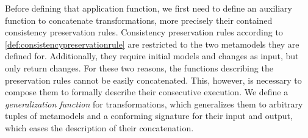 Before defining that application function, we first need to define an auxiliary function to concatenate transformations, more precisely their contained consistency preservation rules.
Consistency preservation rules according to \autoref{def:consistencypreservationrule} are restricted to the two metamodels they are defined for.
Additionally, they require initial models and changes as input, but only return changes.
For these two reasons, the functions describing the preservation rules cannot be easily concatenated.
This, however, is necessary to compose them to formally describe their consecutive execution.
We define a \emph{generalization function} for transformations, which generalizes them to arbitrary tuples of metamodels and a conforming signature for their input and output, which eases the description of their concatenation.

